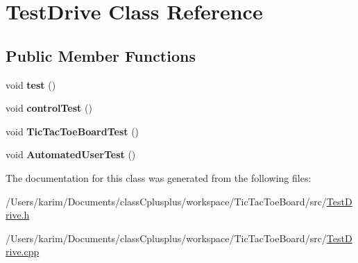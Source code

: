 \hypertarget{class_test_drive}{}\section{Test\+Drive Class Reference}
\label{class_test_drive}
\subsection*{Public Member Functions}
\begin{DoxyCompactItemize}
\item 
\hypertarget{class_test_drive_a62b4a96db63635074eb22e9a416c4c8d}{}void {\bfseries test} ()\label{class_test_drive_a62b4a96db63635074eb22e9a416c4c8d}

\item 
\hypertarget{class_test_drive_a08970f7f1ae685f517c1f2a9263bbe1f}{}void {\bfseries control\+Test} ()\label{class_test_drive_a08970f7f1ae685f517c1f2a9263bbe1f}

\item 
\hypertarget{class_test_drive_ad1fd95b6476a769c82d1f1c802528855}{}void {\bfseries Tic\+Tac\+Toe\+Board\+Test} ()\label{class_test_drive_ad1fd95b6476a769c82d1f1c802528855}

\item 
\hypertarget{class_test_drive_a235b0ea07f227e08280cc54a981b3b44}{}void {\bfseries Automated\+User\+Test} ()\label{class_test_drive_a235b0ea07f227e08280cc54a981b3b44}

\end{DoxyCompactItemize}


The documentation for this class was generated from the following files\+:\begin{DoxyCompactItemize}
\item 
/\+Users/karim/\+Documents/class\+Cplusplus/workspace/\+Tic\+Tac\+Toe\+Board/src/\hyperlink{_test_drive_8h}{Test\+Drive.\+h}\item 
/\+Users/karim/\+Documents/class\+Cplusplus/workspace/\+Tic\+Tac\+Toe\+Board/src/\hyperlink{_test_drive_8cpp}{Test\+Drive.\+cpp}\end{DoxyCompactItemize}
